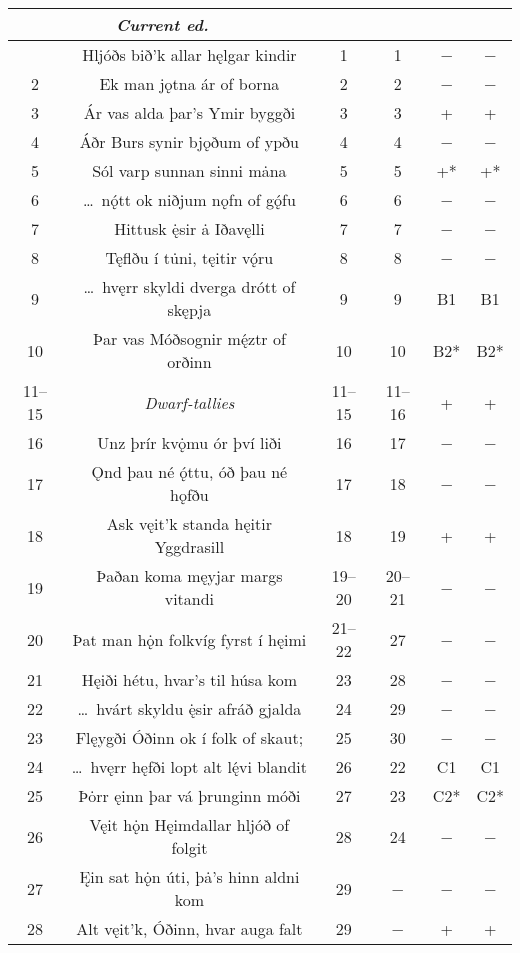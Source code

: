 \begin{longtable}{|c c c c c c|}
	\hline
	\multicolumn{2}{|c}{\emph{Current ed.}} & \Regius & \Hauksbok & \RegiusProse\Trajectinus\Wormianus & \Upsaliensis \\ [0.5ex]
	\hline\hline\endhead
	\hline\endfoot
	1 & Hljóðs bið’k allar hęlgar kindir & 1 & 1 & − & − \\
	2 & Ek man jǫtna ár of borna & 2 & 2 & − & − \\
	3 & Ár vas alda þar’s Ymir byggði & 3 & 3 & + & + \\
	4 & Áðr Burs synir bjǫðum of ypðu & 4 & 4 & − & − \\
	5 & Sól varp sunnan sinni mȧna & 5 & 5 & +* & +* \\
	6 & \dots\ nǫ́tt ok niðjum nǫfn of gǫ́fu & 6 & 6 & − & − \\
	7 & Hittusk ę̇sir ȧ Iðavęlli & 7 & 7 & − & − \\
	8 & Tęflðu í tu̇ni, tęitir vǫ́ru & 8 & 8 & − & − \\
	9 & \dots\ hvęrr skyldi dverga drótt of skępja & 9 & 9 & B1 & B1 \\
	10 & Þar vas Móðsognir mę́ztr of orðinn & 10 & 10 & B2* & B2* \\
	11–15 & \emph{Dwarf-tallies} & 11–15 & 11–16 & + & + \\
	16 & Unz þrír kvǫ̇mu ór því liði & 16 & 17 & − & − \\
	17 & Ǫnd þau né ǫ́ttu, óð þau né hǫfðu & 17 & 18 & − & − \\
	18 & Ask vęit’k standa hęitir Yggdrasill & 18 & 19 & + & + \\
	19 & Þaðan koma męyjar margs vitandi & 19–20 & 20–21 & − & − \\
	20 & Þat man hǫ̇n folkvíg fyrst í hęimi & 21–22 & 27 & − & − \\
	21 & Hęiði hétu, hvar’s til húsa kom & 23 & 28 & − & − \\
	22 & \dots\ hvárt skyldu ę̇sir afráð gjalda & 24 & 29 & − & − \\
	23 & Flęygði Óðinn ok í folk of skaut; & 25 & 30 & − & − \\
	24 & \dots\ hvęrr hęfði lopt alt lę́vi blandit & 26 & 22 & C1 & C1 \\
	25 & Þȯrr ęinn þar vá þrunginn móði & 27 & 23 & C2* & C2* \\
	26 & Vęit hǫ̇n Hęimdallar hljóð of folgit & 28 & 24 & − & − \\
	27 & Ęin sat hǫ̇n úti, þȧ’s hinn aldni kom & 29 & − & − & − \\
	28 & Alt vęit’k, Óðinn, hvar auga falt & 29 & − & + & + \\

\end{longtable}
